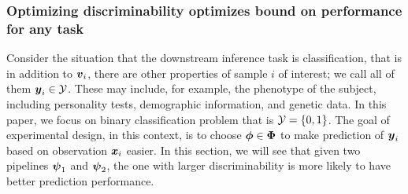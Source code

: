 \documentclass{article}
\begin{document}
\subsubsection{Optimizing discriminability optimizes bound on performance for any task}

Consider the situation that the downstream inference task is classification, that is in addition to $\boldsymbol{v}_i$, there are other properties of sample $i$ of interest; we call all of them $\boldsymbol{y}_i \in \mathcal{Y}$.  These may include, for example, the phenotype of the subject, including personality tests, demographic information, and genetic data. In this paper, we focus on binary classification problem that is $\mathcal{Y}=\{0,1\}$. The goal of experimental design, in this context, is to choose $\boldsymbol{\phi} \in \boldsymbol{\Phi}$ to make prediction of $\boldsymbol{y}_i$ based on observation $\boldsymbol{x}_i$ easier. In this section, we will see that given two pipelines $\boldsymbol{\psi}_1$ and $\boldsymbol{\psi}_2$, the one with larger discriminability is more likely to have better prediction performance.  
\end{document}
